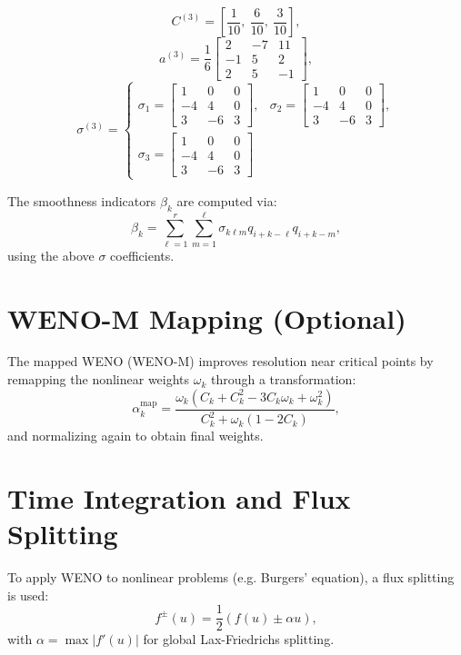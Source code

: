 \documentclass{article}
\begin{document}
\[
C^{(3)} = \left[ \frac{1}{10},\ \frac{6}{10},\ \frac{3}{10} \right],
\]
\[
a^{(3)} = \frac{1}{6}
\begin{bmatrix}
2 & -7 & 11 \\
-1 & 5 & 2 \\
2 & 5 & -1
\end{bmatrix},
\]
\[
\sigma^{(3)} = 
\left\{
\begin{array}{ll}
\sigma_1 =
\begin{bmatrix}
1 & 0 & 0 \\
-4 & 4 & 0 \\
3 & -6 & 3
\end{bmatrix}, &

\sigma_2 =
\begin{bmatrix}
1 & 0 & 0 \\
-4 & 4 & 0 \\
3 & -6 & 3
\end{bmatrix}, \\[1em]

\sigma_3 =
\begin{bmatrix}
1 & 0 & 0 \\
-4 & 4 & 0 \\
3 & -6 & 3
\end{bmatrix}
\end{array}
\right.
\]

The smoothness indicators \( \beta_k \) are computed via:
\[
\beta_k = \sum_{\ell=1}^r \sum_{m=1}^\ell \sigma_{k\ell m} q_{i+k-\ell} q_{i+k-m},
\]
using the above \( \sigma \) coefficients.



\section*{WENO-M Mapping (Optional)}

The mapped WENO (WENO-M) improves resolution near critical points by remapping the nonlinear weights $\omega_k$ through a transformation:
\[
\alpha_k^{\text{map}} = \frac{\omega_k (C_k + C_k^2 - 3 C_k \omega_k + \omega_k^2)}{C_k^2 + \omega_k(1 - 2 C_k)},
\]
and normalizing again to obtain final weights.

\section*{Time Integration and Flux Splitting}

To apply WENO to nonlinear problems (e.g. Burgers' equation), a flux splitting is used:
\[
f^\pm(u) = \frac{1}{2} (f(u) \pm \alpha u),
\]
with $\alpha = \max |f'(u)|$ for global Lax-Friedrichs splitting.
\end{document}
